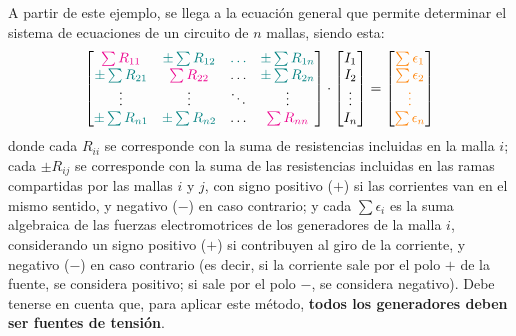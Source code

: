 	A partir de este ejemplo, se llega a la ecuación general que
        permite determinar el sistema de ecuaciones de un circuito de
        $n$ mallas, siendo esta:
	\begin{equation*}
          \begin{bmatrix}
            {\color{magenta}\sum R_{11}} &  {\color{teal}\pm\sum R_{12}} & {\color{teal}{\dots}} & {\color{teal}\pm\sum R_{1n}} \\
            {\color{teal}\pm\sum R_{21}} & {\color{magenta}\sum R_{22}} & {{\dots}} & {\color{teal}\pm\sum R_{2n}} \\
            {\vdots} & {\vdots} &  {\ddots} & \vdots\\
            {\color{teal}\pm\sum R_{n1}} & {\color{teal}\pm\sum R_{n2}} & \dots & {\color{magenta}\sum R_{nn}}
          \end{bmatrix} \cdot 
          \begin{bmatrix}
            I_1\\
            I_2\\
            \vdots\\
            I_n
          \end{bmatrix} = %
          \begin{bmatrix}
            {\color{orange}\sum\epsilon_1}\\
            {\color{orange}\sum\epsilon_2}\\
            {\color{orange}\vdots}\\
            {\color{orange}\sum\epsilon_n}
          \end{bmatrix}
	\end{equation*}
	donde cada {\color{magenta}$R_{ii}$} se corresponde con la
        suma de resistencias incluidas en la malla $i$; cada
        {\color{teal}$\pm R_{ij}$} se corresponde con la suma de las
        resistencias incluidas en las ramas compartidas por las mallas
        $i$ y $j$, con signo positivo ($+$) si las corrientes van en
        el mismo sentido, y negativo ($-$) en caso contrario; y cada
        {\color{orange} $\sum \epsilon_i$} es la suma algebraica de
        las fuerzas electromotrices de los generadores de la malla
        $i$, considerando un signo positivo ($+$) si contribuyen al
        giro de la corriente, y negativo ($-$) en caso contrario (es
        decir, si la corriente sale por el polo $+$ de la fuente, se
        considera positivo; si sale por el polo $-$, se considera
        negativo). Debe tenerse en cuenta que, para aplicar este
        método, \textbf{todos los generadores deben ser fuentes de
          tensión}.
	
